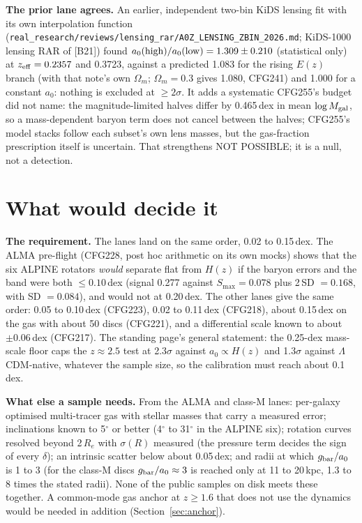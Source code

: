 \documentclass[10pt]{article}
\newcommand{\fpath}[1]{\nolinkurl{#1}}
\begin{document}
\textbf{The prior lane agrees.} An earlier, independent two-bin KiDS lensing fit with its own interpolation function (\fpath{real_research/reviews/lensing_rar/A0Z_LENSING_ZBIN_2026.md}; KiDS-1000 lensing RAR of [B21]) found $a_0({\rm high})/a_0({\rm low})=1.309\pm0.210$ (statistical only) at $z_{\rm eff}=0.2357$ and 0.3723, against a predicted 1.083 for the rising $E(z)$ branch (with that note's own $\Omega_m$; $\Omega_m=0.3$ gives 1.080, CFG241) and 1.000 for a constant $a_0$: nothing is excluded at $\ge2\sigma$. It adds a systematic CFG255's budget did not name: the magnitude-limited halves differ by 0.465\,dex in mean $\log M_{\rm gal}$, so a mass-dependent baryon term does not cancel between the halves; CFG255's model stacks follow each subset's own lens masses, but the gas-fraction prescription itself is uncertain. That strengthens NOT POSSIBLE; it is a null, not a detection.

\section{What would decide it}\label{sec:decide}

\textbf{The requirement.} The lanes land on the same order, 0.02 to 0.15\,dex. The ALMA pre-flight (CFG228, post hoc arithmetic on its own mocks) shows that the six ALPINE rotators \emph{would} separate flat from $H(z)$ if the baryon errors and the band were both $\le0.10$\,dex (signal 0.277 against $S_{\max}=0.078$ plus 2\,SD $=0.168$, with SD $=0.084$), and would not at 0.20\,dex. The other lanes give the same order: 0.05 to 0.10\,dex (CFG223), 0.02 to 0.11\,dex (CFG218), about 0.15\,dex on the gas with about 50 discs (CFG221), and a differential scale known to about $\pm0.06$\,dex (CFG217). The standing page's general statement: the 0.25-dex mass-scale floor caps the $z\approx2.5$ test at 2.3$\sigma$ against $a_0\propto H(z)$ and 1.3$\sigma$ against $\Lambda$CDM-native, whatever the sample size, so the calibration must reach about 0.1\,dex.

\textbf{What else a sample needs.} From the ALMA and class-M lanes: per-galaxy optimised multi-tracer gas with stellar masses that carry a measured error; inclinations known to 5$^\circ$ or better (4$^\circ$ to 31$^\circ$ in the ALPINE six); rotation curves resolved beyond 2\,$R_e$ with $\sigma(R)$ measured (the pressure term decides the sign of every $\delta$); an intrinsic scatter below about 0.05\,dex; and radii at which $g_{\rm bar}/a_0$ is 1 to 3 (for the class-M discs $g_{\rm bar}/a_0\approx3$ is reached only at 11 to 20\,kpc, 1.3 to 8 times the stated radii). None of the public samples on disk meets these together. A common-mode gas anchor at $z\ge1.6$ that does not use the dynamics would be needed in addition (Section~\ref{sec:anchor}).
\end{document}
